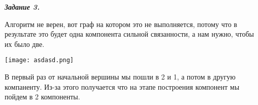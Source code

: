 \documentclass[12pt, a4paper]{scrartcl}
\begin{document}
\newpage\emph{\textbf{Задание 3.}}\par
Алгоритм не верен, вот граф на котором это не выполняется, потому что в результате это будет одна компонента сильной связанности, а нам нужно, чтобы их было две.\par
\texttt{[image: asdasd.png]}\par
В первый раз от начальной вершины мы пошли в 2 и 1, а потом в другую компаненту. Из-за этого получается что на этапе построения компонент мы пойдем в 2 компоненты.
\end{document}
